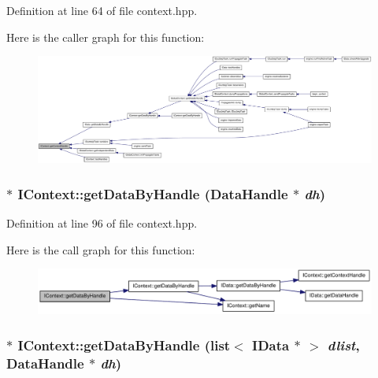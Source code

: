Definition at line 64 of file context.hpp.

Here is the caller graph for this function:\nopagebreak
\begin{figure}[H]
\begin{center}
\leavevmode
\includegraphics[width=420pt]{class_i_context_a63664480f4eede6b3a5ab572dd454160_icgraph}
\end{center}
\end{figure}
\hypertarget{class_i_context_aebeefdc5ccb54aeb883e79665ddf2513}{
\subsubsection[{getDataByHandle}]{$\ast$ IContext::getDataByHandle ({\bf DataHandle} $\ast$ {\em dh})}}
\label{class_i_context_aebeefdc5ccb54aeb883e79665ddf2513}


Definition at line 96 of file context.hpp.

Here is the call graph for this function:\nopagebreak
\begin{figure}[H]
\begin{center}
\leavevmode
\includegraphics[width=346pt]{class_i_context_aebeefdc5ccb54aeb883e79665ddf2513_cgraph}
\end{center}
\end{figure}
\hypertarget{class_i_context_a9e05e14cdde2f0b5a0ed3349815cb974}{
\subsubsection[{getDataByHandle}]{$\ast$ IContext::getDataByHandle (list$<$ {\bf IData} $\ast$ $>$ {\em dlist}, \/  {\bf DataHandle} $\ast$ {\em dh})}}
\label{class_i_context_a9e05e14cdde2f0b5a0ed3349815cb974}


